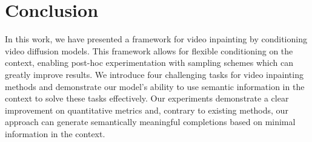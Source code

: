 
\chapter{Conclusion}
In this work, we have presented a framework for video inpainting by conditioning video diffusion models. This framework allows for flexible conditioning on the context, enabling post-hoc experimentation with sampling schemes which can greatly improve results. We introduce four challenging tasks for video inpainting methods and demonstrate our model's ability to use semantic information in the context to solve these tasks effectively. Our experiments demonstrate a clear improvement on quantitative metrics and, contrary to existing methods, our approach can generate semantically meaningful completions based on minimal information in the context.

